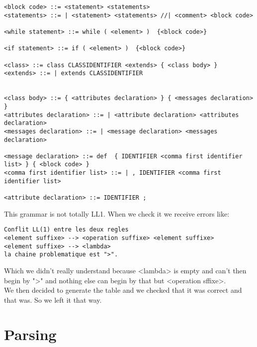 \documentclass{eplDoc}
\begin{document}
\begin{lstlisting}
<block code> ::= <statement> <statements>
<statements> ::= | <statement> <statements> //| <comment> <block code>

<while statement> ::= while ( <element> )  {<block code>}

<if statement> ::= if ( <element> )  {<block code>}

<class> ::= class CLASSIDENTIFIER <extends> { <class body> }
<extends> ::= | extends CLASSIDENTIFIER


<class body> ::= { <attributes declaration> } { <messages declaration> }
<attributes declaration> ::= | <attribute declaration> <attributes declaration>
<messages declaration> ::= | <message declaration> <messages declaration>

<message declaration> ::= def  { IDENTIFIER <comma first identifier list> } { <block code> }
<comma first identifier list> ::= | , IDENTIFIER <comma first identifier list>

<attribute declaration> ::= IDENTIFIER ;
\end{lstlisting}

This grammar is not totally LL1.  When we check it we receive errors like:
\begin{lstlisting}
Conflit LL(1) entre les deux regles 
<element suffixe> --> <operation suffixe> <element suffixe> 
<element suffixe> --> <lambda>
la chaine problematique est ">".
\end{lstlisting}
Which we didn't really understand because <lambda> is empty and can't then begin by ">" and nothing else can begin by that but <operation sffixe>.\\
We then decided to generate the table and we checked that it was correct and that was. So we left it that way.


\section{Parsing}
\end{document}
